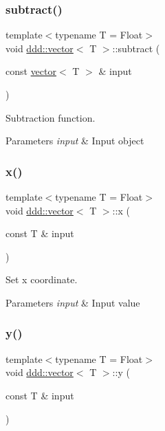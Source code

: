 \subsubsection{\texorpdfstring{subtract()}{subtract()}}
{\footnotesize\ttfamily template$<$typename T = Float$>$ \\
void \hyperlink{classddd_1_1vector}{ddd\+::vector}$<$ T $>$\+::subtract (\begin{DoxyParamCaption}\item[{const \hyperlink{classddd_1_1vector}{vector}$<$ T $>$ \&}]{input }\end{DoxyParamCaption})\hspace{0.3cm}{\ttfamily [inline]}}



Subtraction function. 


\begin{DoxyParams}{Parameters}
{\em input} & Input object \\
\hline
\end{DoxyParams}
\mbox{\label{classddd_1_1vector_a3a431ffa7d2681cf26f6b2dd5052de65}} 
\subsubsection{\texorpdfstring{x()}{x()}}
{\footnotesize\ttfamily template$<$typename T = Float$>$ \\
void \hyperlink{classddd_1_1vector}{ddd\+::vector}$<$ T $>$\+::x (\begin{DoxyParamCaption}\item[{const T \&}]{input }\end{DoxyParamCaption})\hspace{0.3cm}{\ttfamily [inline]}}



Set x coordinate. 


\begin{DoxyParams}{Parameters}
{\em input} & Input value \\
\hline
\end{DoxyParams}
\mbox{\label{classddd_1_1vector_a516506aadad05ec33fca8e01a63ab19f}} 
\subsubsection{\texorpdfstring{y()}{y()}}
{\footnotesize\ttfamily template$<$typename T = Float$>$ \\
void \hyperlink{classddd_1_1vector}{ddd\+::vector}$<$ T $>$\+::y (\begin{DoxyParamCaption}\item[{const T \&}]{input }\end{DoxyParamCaption})\hspace{0.3cm}{\ttfamily [inline]}}



